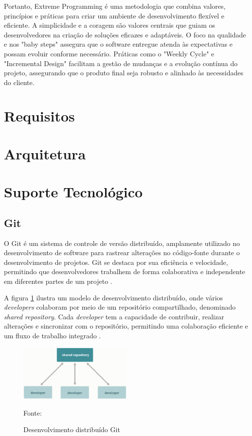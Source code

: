 Portanto, Extreme Programming é uma metodologia que combina valores, princípios e práticas para criar um ambiente de desenvolvimento flexível e eficiente. A simplicidade e a coragem são valores centrais que guiam os desenvolvedores na criação de soluções eficazes e adaptáveis. O foco na qualidade e nos "baby steps" assegura que o software entregue atenda às expectativas e possam evoluir conforme necessário. Práticas como o "Weekly Cycle" e "Incremental Design" facilitam a gestão de mudanças e a evolução contínua do projeto, assegurando que o produto final seja robusto e alinhado às necessidades do cliente.

\section{Requisitos}

\section{Arquitetura}

\section{Suporte Tecnológico}

\subsection{Git}

O Git é um sistema de controle de versão distribuído, amplamente utilizado no desenvolvimento de software para rastrear alterações no código-fonte durante o desenvolvimento de projetos. Git se destaca por sua eficiência e velocidade, permitindo que desenvolvedores trabalhem de forma colaborativa e independente em diferentes partes de um projeto \cite{git2025}.

A figura \ref{fig:git2025} ilustra um modelo de desenvolvimento distribuído, onde vários \textit{developers} colaboram por meio de um repositório compartilhado, denominado \textit{shared repository}. Cada \textit{developer} tem a capacidade de contribuir, realizar alterações e sincronizar com o repositório, permitindo uma colaboração eficiente e um fluxo de trabalho integrado \cite{git2025}.

\begin{figure}[h!]
    \centering
    \includegraphics[width=0.5\textwidth]{figuras/git_distribiuted_work.eps}
    \caption{Desenvolvimento distribuído Git}
    Fonte: \cite{git2025}
    \label{fig:git2025}
\end{figure}

